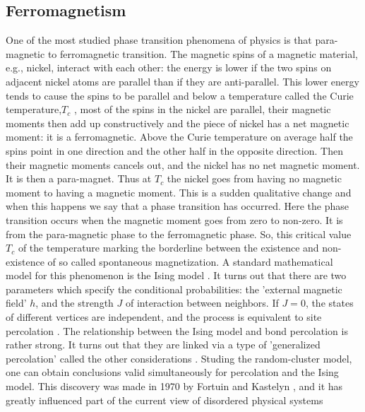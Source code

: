 	
	\subsection{Ferromagnetism}
	One of the most studied phase transition phenomena of physics is that para-magnetic to ferromagnetic transition. The magnetic spins of a magnetic material, e.g., nickel, interact with each other:	the energy is lower if the two spins on adjacent nickel atoms are parallel than if they are anti-parallel. This lower energy tends to cause the spins to be parallel and below a temperature called	the Curie temperature,$T_c$ , most of the spins in the nickel are parallel, their magnetic moments then	add up constructively and the piece of nickel has a net magnetic moment: it is a ferromagnetic.
	 Above the Curie temperature on average half the spins point in one direction and the other half in	the opposite direction. Then their magnetic moments cancels out, and the nickel has no net magnetic	moment. It is then a para-magnet. Thus at $T_c$ the nickel goes from having no magnetic moment to	having a magnetic moment. This is a sudden qualitative change and when this happens we say that	a phase transition has occurred. Here the phase transition occurs when the magnetic moment goes	from zero to non-zero. It is from the para-magnetic phase to the ferromagnetic phase.	So, this critical value $T_c$ of the temperature marking the borderline between the existence and	non-existence of so called spontaneous magnetization. A standard mathematical model for this	phenomenon is the Ising model \cite{Cipra1987}. It turns out that there are two parameters which specify	the conditional probabilities: the 'external magnetic field' $h$, and the strength $J$ of interaction	between neighbors. If $J = 0$, the states of different vertices are independent, and the process is	equivalent to site percolation \cite{Coniglio1976}. The relationship between the Ising model and bond percolation	is rather strong. It turns out that they are linked via a type of 'generalized percolation' called the other considerations \cite{Coleman1992, Seiden1990}. 
	 Studing the random-cluster model,
	 one can obtain conclusions valid simultaneously for percolation and the Ising model.
	 This discovery was made in 1970 by Fortuin and Kastelyn \cite{Fortuin1972a, Fortuin1972b, Fortuin1972c}, and it has
	 greatly influenced part of the current view of disordered physical systems
	 
	 
